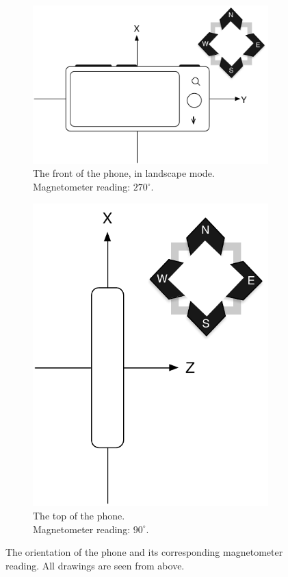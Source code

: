 \begin{figure}[H]
\begin{subfigure}[b]{0.45\textwidth}
		\includegraphics[scale = 0.4]{media/phone-rotation/phone-compass-c}
        \caption[caption]{The front of the phone, in landscape mode.\\Magnetometer reading: $270^{\circ}$.}
		\label{figure:position-yx}
	\end{subfigure}
	\qquad
	\begin{subfigure}[b]{0.45\textwidth}
		\centering
		\includegraphics[scale = 0.4]{media/phone-rotation/phone-compass-e}
        \caption[caption]{The top of the phone.\\Magnetometer reading: $90^{\circ}$.}

		\label{figure:position-xy}
	\end{subfigure}		
	\caption{The orientation of the phone and its corresponding magnetometer reading. All drawings are seen from above.}
	\label{figure:magnetometer-headings}
\end{figure}
